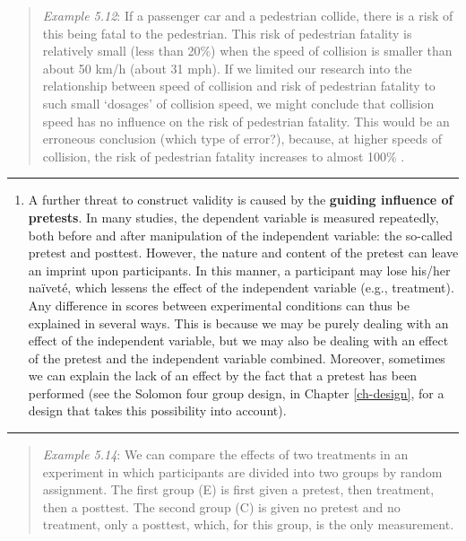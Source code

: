 \documentclass[
]{book}
\providecommand{\tightlist}{%
  \setlength{\itemsep}{0pt}\setlength{\parskip}{0pt}}
\begin{document}
\begin{quote}
\emph{Example 5.12}: If a passenger car and a pedestrian collide, there is a risk of this being fatal to the pedestrian. This risk of pedestrian fatality is relatively small (less than 20\%) when the speed of collision is smaller than about 50 km/h (about 31 mph). If we limited our research into the relationship between speed of collision and risk of pedestrian fatality to such small `dosages' of collision speed, we might conclude that collision speed has no influence on the risk of pedestrian fatality. This would be an erroneous conclusion (which type of error?), because, at higher speeds of collision, the risk of pedestrian fatality increases to almost 100\% \citep{Rosen11, SWOV12}.
\end{quote}

\begin{center}\rule{0.5\linewidth}{0.5pt}\end{center}

\begin{enumerate}
\def\labelenumi{\arabic{enumi}.}
\setcounter{enumi}{4}
\tightlist
\item
  A further threat to construct validity is caused by the \textbf{guiding influence of pretests}. In many studies, the dependent variable is measured repeatedly, both before and after manipulation of the independent variable: the so-called pretest and posttest. However, the nature and content of the pretest can leave an imprint upon participants. In this manner, a participant may lose his/her naïveté, which lessens the effect of the independent variable (e.g., treatment). Any difference in scores between experimental conditions can thus be explained in several ways. This is because we may be purely dealing with an effect of the independent variable, but we may also be dealing with an effect of the pretest and the independent variable combined. Moreover, sometimes we can explain the lack of an effect by the fact that a pretest has been performed
  (see the Solomon four group design, in Chapter \ref{ch-design},
  for a design that takes this possibility into account).
\end{enumerate}

\begin{center}\rule{0.5\linewidth}{0.5pt}\end{center}

\begin{quote}
\emph{Example 5.14}: We can compare the effects of two treatments in an experiment in which participants are divided into two groups by random assignment. The first group (E) is first given a pretest, then treatment, then a posttest. The second group (C) is given no pretest and no treatment, only a posttest, which, for this group, is the only measurement.
\end{quote}
\end{document}
